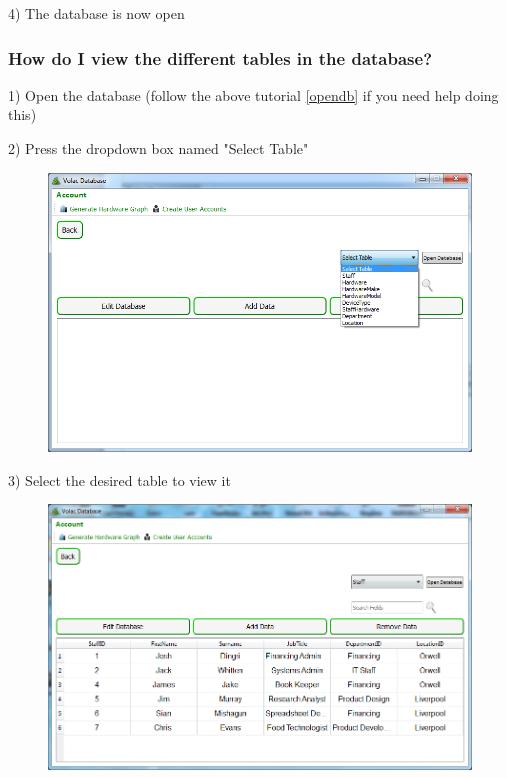 4) The database is now open


\subsubsection{How do I view the different tables in the database?}\label{viewdb}

1) Open the database (follow the above tutorial \ref{opendb} if you need help doing this)

2) Press the dropdown box named "Select Table" 

\begin{figure}[H]
    \includegraphics[width=\textwidth]{./Manual/Images/table1.png}
\end{figure}

3) Select the desired table to view it

\begin{figure}[H]
    \includegraphics[width=\textwidth]{./Manual/Images/tabl2.png}
\end{figure}

